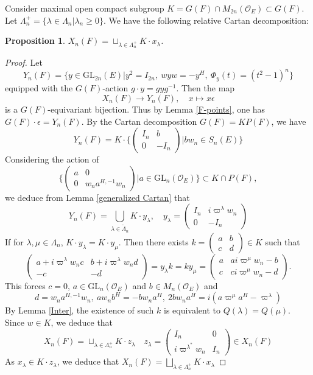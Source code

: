 \documentclass{amsart}
\newtheorem{prop}[theorem]{Proposition}
\theoremstyle{definition}
\theoremstyle{remark}
\newcommand{\1}{\mathbf{1}}
\newcommand{\GL}{\mathrm{GL}}
\theoremstyle{definition}
\newcommand{\CO}{{\mathcal {O}}}
\begin{document}
 Consider maximal open compact subgroup $K=G(F)\cap M_{2n}(\CO_E)\subset G(F)$. Let $\Lambda_n^+=\{\lambda\in\Lambda_n|  \lambda_n\geq 0\}$. 
We have the following relative Cartan decomposition:
\begin{prop}\label{Ralative Cartan} $X_n(F)=\sqcup_{\lambda\in \Lambda_n^+}K\cdot x_\lambda$.
\end{prop}
\begin{proof}
Let \[Y_n(F)=\{y\in \GL_{2n}(E)| y^2=I_{2n},\ wyw=-y^H,\ \Phi_y(t)=(t^2-1)^n\}\] equipped with the $G(F)$-action $g\cdot y=gyg^{-1}$. Then the map \[X_n(F)\to Y_n(F),\quad x\mapsto x\epsilon\]
is a $G(F)$-equivariant bijection. Thus by Lemma \ref{F-points}, one has $G(F)\cdot \epsilon=Y_{n}(F)$. 
By the Cartan decomposition $G(F)=KP(F)$,
we have \[Y_n(F)=K\cdot \{\begin{pmatrix}I_n & b \\ 0 & -I_n\end{pmatrix}| bw_n\in  S_n(E)\}\]
Considering the action of \[\{\begin{pmatrix}a & 0\\ 0 & w_na^{H,-1}w_n\end{pmatrix}|a\in \GL_n(\CO_E)\}\subset K\cap P(F),\]
we deduce from Lemma \ref{generalized Cartan} that 
\[Y_n(F)=\bigcup_{\lambda\in \tilde{\Lambda}_n}K\cdot y_\lambda,\quad y_\lambda=\begin{pmatrix}I_n & i \varpi^\lambda w_n \\ 0 & -I_n\end{pmatrix}\]
If for $\lambda,\mu\in\Lambda_n$, $K\cdot y_\lambda=K\cdot y_\mu$. Then there exists $k=\begin{pmatrix}a & b\\ c & d\end{pmatrix}\in K$ such that 
\[\begin{pmatrix}a+i\varpi^{\lambda}w_nc & b+i\varpi^{\lambda}w_nd \\ -c & -d\end{pmatrix}=y_\lambda k=k y_{\mu}=\begin{pmatrix}a & ai\varpi^{\mu}w_n-b\\ c & ci\varpi^{\mu}w_n-d\end{pmatrix}.\]
This forces $c=0$, $a\in \GL_n(\CO_E)$ and $b\in M_n(\CO_E)$ and \[d=w_n a^{H,-1}w_n,\ aw_nb^H=-bw_na^H,\ 2bw_n a^H=i(a\varpi^\mu a^H-\varpi^\lambda )\]
By Lemma \ref{Inter}, the existence of such $k$ is equivalent to $Q(\lambda)=Q(\mu)$. Since $w\in K$, we deduce that  \[X_n(F)=\sqcup_{\lambda\in \Lambda_n^+}K\cdot z_\lambda\quad z_\lambda=
\begin{pmatrix} I_n &  0\\ i \varpi^{\lambda^*}w_n  & I_n \end{pmatrix}\in X_n(F)\]
As $x_\lambda\in K\cdot z_\lambda$, we deduce that $X_n(F)=\bigsqcup_{\lambda\in \Lambda_n^+}K\cdot x_\lambda$
\end{proof}
\end{document}
